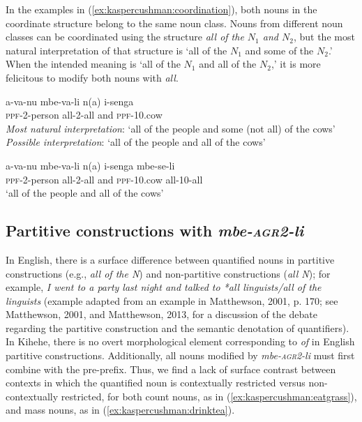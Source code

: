 \documentclass[letterpaper, 12pt]{article}
\begin{document}
In the examples in (\ref{ex:kaspercushman:coordination}), both nouns in the coordinate structure belong to the same noun class. Nouns from different noun classes can be coordinated using the structure \textit{all of the $N_{1}$ and $N_{2}$}, but the most natural interpretation of that structure is `all of the $N_{1}$ and some of the $N_{2}$.'  When the intended meaning is `all of the $N_{1}$ and all of the $N_{2}$,' it is more felicitous to modify both nouns with \textit{all}.  

\begin{exe}
\singlespacing
\ex \begin{xlist}

\ex \gll a-va-nu mbe-va-li n(a) i-senga \\
\textsc{ppf}-2-person all-2-all and \textsc{ppf}-10.cow \\
\textit{Most natural interpretation}: `all of the people and some (not all) of the cows' \\
\textit{Possible interpretation}: `all of the people and all of the cows' \\

\vspace{2mm}

\ex \gll a-va-nu mbe-va-li n(a) i-senga mbe-se-li \\
\textsc{ppf}-2-person all-2-all and \textsc{ppf}-10.cow all-10-all \\
`all of the people and all of the cows' 

\end{xlist}
\end{exe}

\subsection{Partitive constructions with \emph{mbe-\textsc{agr2}-li}}

In English, there is a surface difference between quantified nouns in partitive constructions (e.g., \textit{all of the N}) and non-partitive constructions (\textit{all N}); for example, \textit{I went to a party last night and talked to *all linguists/all of the linguists} (example adapted from an example in Matthewson, 2001, p. 170; see Matthewson, 2001, and Matthewson, 2013, for a discussion of the debate regarding the partitive construction and the semantic denotation of quantifiers). In Kihehe, there is no overt morphological element corresponding to \textit{of} in English partitive constructions. Additionally, all nouns modified by \emph{mbe-\textsc{agr2}-li} must first combine with the pre-prefix.  Thus, we find a lack of surface contrast between contexts in which the quantified noun is contextually restricted versus non-contextually restricted, for both count nouns, as in (\ref{ex:kaspercushman:eatgrass}), and mass nouns, as in (\ref{ex:kaspercushman:drinktea}).
\end{document}
